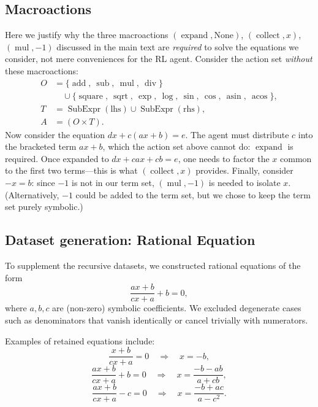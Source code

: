 \documentclass{article}
\theoremstyle{plain}
\theoremstyle{definition}
\theoremstyle{remark}
\newcommand{\op}[1]{\operatorname{#1}}
\newcommand{\SubExpr}{\operatorname{SubExpr}}
\begin{document}
\nocite{langley00}




\newpage
\appendix
\onecolumn


\subsection{Macroactions}
Here we justify why the three macroactions $(\op{expand}, \text{None})$, $(\op{collect}, x)$, $(\op{mul}, -1)$ discussed in the main text are \textit{required} to solve the equations we consider, not mere conveniences for the RL agent. Consider the action set \textit{without} these macroactions:
\begin{align}
O &= \{\op{add},\ \op{sub},\ \op{mul},\ \op{div}\} \nonumber \\
  &\quad \cup \{\op{square},\ \op{sqrt},\ \op{exp},\ \op{log},\ \op{sin},\ \op{cos},\ \op{asin},\ \op{acos}\}, \\
T &= \SubExpr(\text{lhs}) \cup \SubExpr(\text{rhs}), \\
A &= (O \times T).
\end{align}
Now consider the equation $dx + c(ax+b) = e$. The agent must distribute $c$ into the bracketed term $ax+b$, which the action set above cannot do: $\op{expand}$ is required. Once expanded to $dx + cax + cb = e$, one needs to factor the $x$ common to the first two terms---this is what $(\op{collect}, x)$ provides. Finally, consider $-x = b$: since $-1$ is not in our term set, $(\op{mul}, -1)$ is needed to isolate $x$. (Alternatively, $-1$ could be added to the term set, but we chose to keep the term set purely symbolic.)


\subsection{Dataset generation: Rational Equation  }

To supplement the recursive datasets, we constructed rational equations of the form
\[
\frac{a x + b}{c x + a} + b = 0,
\]
where \(a,b,c\) are (non-zero) symbolic coefficients. We excluded degenerate cases such as denominators that vanish identically or cancel trivially with numerators.

Examples of retained equations include:
\[
\frac{x+b}{c x + a} = 0 
\quad \Rightarrow \quad x = -b,
\]
\[
\frac{a x+b}{c x+a} + b = 0 
\quad \Rightarrow \quad x = \frac{-b - a b}{a + c b},
\]
\[
\frac{a x+b}{c x+a} - c = 0 
\quad \Rightarrow \quad x = \frac{-b + a c}{a - c^2}.
\]
\end{document}
